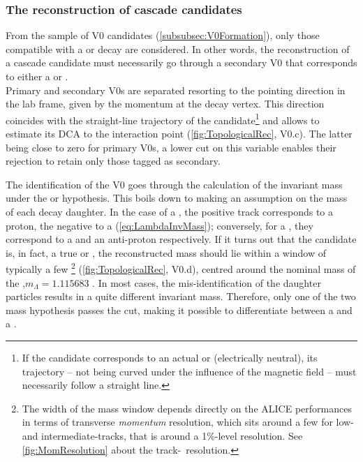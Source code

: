 \subsubsection{The reconstruction of cascade candidates}
\label{subsubsec:CascadeFormation}

From the sample of V0 candidates (\Sec\ref{subsubsec:V0Formation}), only those compatible with a \rmXiPM or \rmOmegaPM decay are considered. In other words, the reconstruction of a cascade candidate must necessarily go through a secondary V0 that corresponds to either a \rmLambda or \rmAlambda.\\

Primary and secondary V0s are separated resorting to the pointing direction in the lab frame, given by the momentum at the decay vertex. This direction coincides with the straight-line trajectory of the candidate\footnote{If the candidate corresponds to an actual \rmLambda or \rmAlambda (electrically neutral), its trajectory -- not being curved under the influence of the magnetic field -- must necessarily follow a straight line.} and allows to estimate its DCA to the interaction point (\fig\ref{fig:TopologicalRec}, V0.c). The latter being close to zero for primary V0s, a lower cut on this variable enables their rejection to retain only those tagged as secondary. 

The identification of the V0 goes through the calculation of the invariant mass under  the \rmLambda or \rmAlambda hypothesis. This boils down to making an assumption on the mass of each decay daughter. In the case of a \rmLambda, the positive track corresponds to a proton, the negative to a \piMinus (\eq\ref{eq:LambdaInvMass}); conversely, for a \rmAlambda, they correspond to a \piPlus and an anti-proton respectively. If it turns out that the candidate is, in fact, a true \rmLambda or \rmAlambda, the reconstructed mass should lie within a window of typically a few \mmass\footnote{The width of the mass window depends directly on the ALICE performances in terms of transverse \emph{momentum} resolution, which sits around a few \mmom for low- and intermediate-\pT tracks, that is around a 1\%-level resolution. See \fig\ref{fig:MomResolution} about the track-\pT\ resolution.} (\fig\ref{fig:TopologicalRec}, V0.d), centred around the nominal mass of the \rmLambda,\break $m_{\Lambda} = 1.115683$ \gmass. In most cases, the mis-identification of the daughter particles results in a quite different invariant mass. Therefore, only one of the two mass hypothesis passes the cut, making it possible to differentiate between a \rmLambda and a \rmAlambda.

